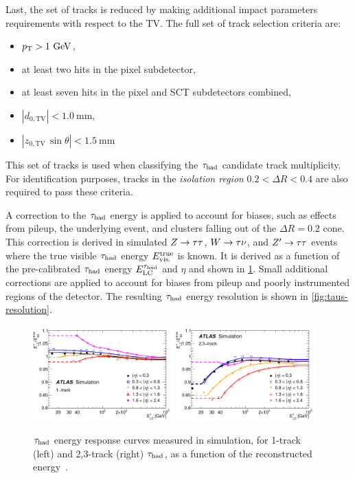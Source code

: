 Last, the set of tracks is reduced by making additional impact parameters requirements with respect to the TV. The full set of track selection criteria are:
%
\begin{itemize}
    \item $p_{\mathrm{T}} > 1~\mathrm{GeV}$,
    \item at least two hits in the pixel subdetector,
    \item at least seven hits in the pixel and SCT subdetectors combined,
    \item $|d_{0,\text{TV}}| < 1.0~\mathrm{mm}$,
    \item $|z_{0,\text{TV}} \, \sin{\theta}| < 1.5~\mathrm{mm}$
\end{itemize}
%
This set of tracks is used when classifying the $\tau_\text{had}$ candidate track multiplicity. For identification purposes, tracks in the \textit{isolation region} $0.2 < \Delta R < 0.4$ are also required to pass these criteria.


A correction to the $\tau_\text{had}$ energy is applied to account for biases, such as effects from pileup, the underlying event, and clusters falling out of the $\Delta R = 0.2$ cone. This correction is derived in simulated $Z\rightarrow\tau\tau$, $W\rightarrow\tau\nu$, and $Z^{\prime}\rightarrow\tau\tau$ events where the true visible $\tau_\text{had}$ energy $E_\text{vis.}^\text{true}$ is known. It is derived as a function of the pre-calibrated $\tau_\text{had}$ energy $E_\text{LC}^{\tau_\text{had}}$ and $\eta$ and shown in \cref{fig:taus-calibration}. Small additional corrections are applied to account for biases from pileup and poorly instrumented regions of the detector. The resulting $\tau_\text{had}$ energy resolution is shown in \cref{fig:taus-resolution}.

\begin{figure}[tp]
  \centering
  \includegraphics[width=0.48\textwidth]{figures/PERF-2013-06/fig_15a}
  \includegraphics[width=0.48\textwidth]{figures/PERF-2013-06/fig_15b}
  \caption{$\tau_\text{had}$ energy response curves measured in simulation, for 1-track (left) and 2,3-track (right) $\tau_\text{had}$, as a function of the reconstructed energy~\cite{PERF-2013-06}.}
  \label{fig:taus-calibration}
\end{figure}

